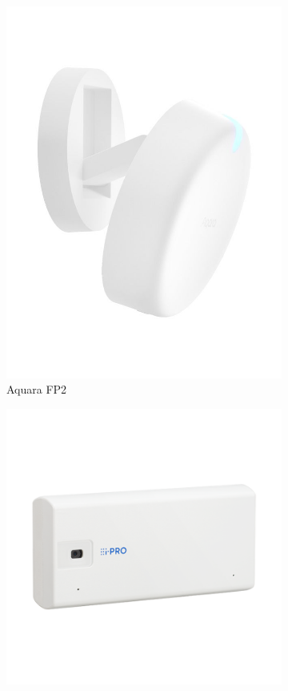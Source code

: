 \begin{figure}[H]
\begin{subfigure}{0.2\textwidth}
        \includegraphics[width=\textwidth]{Images/Products/aquara_fp2.jpg}
        \caption{\centering Aquara FP2}
        \label{fig:aquara_fp2}
    \end{subfigure}
    \hspace{30pt}%
    \begin{subfigure}{0.2\textwidth}
        \centering
        \includegraphics[width=\textwidth]{Images/Products/iPRO_wv-s71300-f3.png}

\end{subfigure}
\end{figure}

